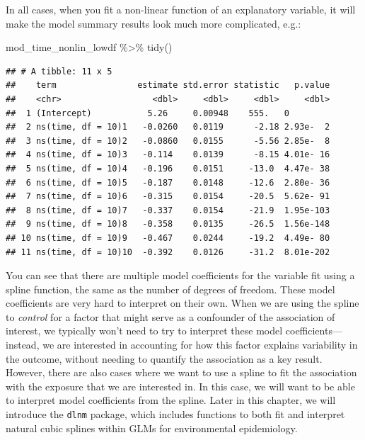 \documentclass[
]{book}
\newenvironment{Shaded}{\begin{snugshade}}{\end{snugshade}}
\newcommand{\FunctionTok}[1]{\textcolor[rgb]{0.00,0.00,0.00}{#1}}
\newcommand{\NormalTok}[1]{#1}
\newcommand{\SpecialCharTok}[1]{\textcolor[rgb]{0.00,0.00,0.00}{#1}}
\begin{document}
In all cases, when you fit a non-linear function of an explanatory variable,
it will make the model summary results look much more complicated, e.g.:

\begin{Shaded}
\begin{Highlighting}[]
\NormalTok{mod\_time\_nonlin\_lowdf }\SpecialCharTok{\%\textgreater{}\%} 
  \FunctionTok{tidy}\NormalTok{()}
\end{Highlighting}
\end{Shaded}

\begin{verbatim}
## # A tibble: 11 x 5
##    term                estimate std.error statistic   p.value
##    <chr>                  <dbl>     <dbl>     <dbl>     <dbl>
##  1 (Intercept)           5.26     0.00948    555.   0        
##  2 ns(time, df = 10)1   -0.0260   0.0119      -2.18 2.93e-  2
##  3 ns(time, df = 10)2   -0.0860   0.0155      -5.56 2.85e-  8
##  4 ns(time, df = 10)3   -0.114    0.0139      -8.15 4.01e- 16
##  5 ns(time, df = 10)4   -0.196    0.0151     -13.0  4.47e- 38
##  6 ns(time, df = 10)5   -0.187    0.0148     -12.6  2.80e- 36
##  7 ns(time, df = 10)6   -0.315    0.0154     -20.5  5.62e- 91
##  8 ns(time, df = 10)7   -0.337    0.0154     -21.9  1.95e-103
##  9 ns(time, df = 10)8   -0.358    0.0135     -26.5  1.56e-148
## 10 ns(time, df = 10)9   -0.467    0.0244     -19.2  4.49e- 80
## 11 ns(time, df = 10)10  -0.392    0.0126     -31.2  8.01e-202
\end{verbatim}

You can see that there are multiple model coefficients for the variable fit
using a spline function, the same as the number of degrees of freedom. These
model coefficients are very hard to interpret on their own. When we are using
the spline to \emph{control} for a factor that might serve as a confounder of the
association of interest, we typically won't need to try to interpret these
model coefficients---instead, we are interested in accounting for how this
factor explains variability in the outcome, without needing to quantify the
association as a key result. However, there are also cases where we want to
use a spline to fit the association with the exposure that we are interested
in. In this case, we will want to be able to interpret model coefficients from
the spline. Later in this chapter, we will introduce the \texttt{dlnm} package, which
includes functions to both fit and interpret natural cubic splines within
GLMs for environmental epidemiology.
\end{document}
